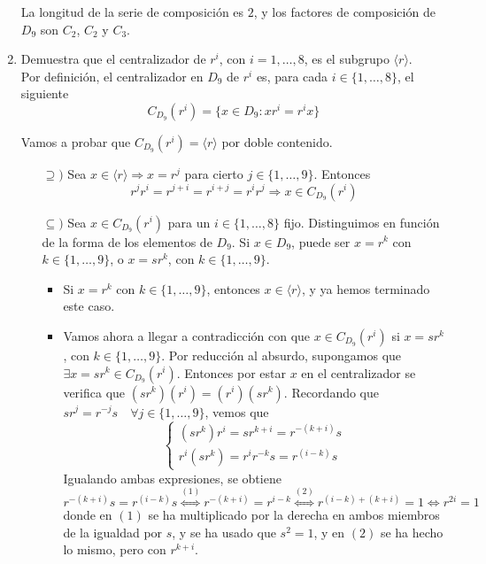 \documentclass[12pt]{article}
\begin{document}
\begin{ejercicio}[3 puntos]
\begin{enumerate}[label=(\alph*)]
            La longitud de la serie de composición es $2$, y los factores de composición de $D_9$ son $C_2$, $C_2$ y $C_3$.

            \item Demuestra que el centralizador de $r^i$, con $i = 1,\dots,8$, es el subgrupo $\langle r \rangle$. \\
            
            Por definición, el centralizador en $D_9$ de $r^i$ es, para cada $i \in \{1, \ldots, 8\}$, el siguiente $$C_{D_9}(r^i) = \{x \in D_9 : xr^i = r^ix\}$$

            Vamos a probar que $C_{D_9}(r^i) = \langle r \rangle$ por doble contenido.

            \begin{itemize}
                \item[$\supseteq)$] Sea $x \in \langle r \rangle \Longrightarrow x = r^j$ para cierto $j \in \{1, \ldots, 9\}$. Entonces $$r^{j}r^{i} = r^{j+i} = r^{i+j} = r^{i}r^{j} \Longrightarrow x \in C_{D_9}(r^i)$$
                \item[$\subseteq)$] Sea $x \in C_{D_9}(r^i)$ para un $i \in \{1, \ldots, 8\}$ fijo. Distinguimos en función de la forma de los elementos de $D_9$. Si $x \in D_9$, puede ser $x = r^k$ con $k \in \{1, \ldots, 9\}$, o $x = sr^k$, con $k \in \{1, \ldots, 9\}$.
                \begin{itemize}
                    \item Si $x = r^k$ con $k \in \{1, \ldots, 9\}$, entonces $x \in \langle r \rangle$, y ya hemos terminado este caso.
                    \item Vamos ahora a llegar a contradicción con que $x \in C_{D_9}(r^i)$ si $x = sr^k$, con $k \in \{1, \ldots, 9\}$. Por reducción al absurdo, supongamos que $\exists x = sr^k \in C_{D_9}(r^i)$. Entonces por estar $x$ en el centralizador se verifica que $(sr^k)(r^i) = (r^i)(sr^k)$.
                    Recordando que $sr^j = r^{-j} s \quad \forall j \in \{1, \ldots, 9\}$, vemos que $$\begin{cases}
                        (sr^k)r^i = sr^{k+i} = r^{-(k+i)}s \\
                        r^i(sr^k) = r^i r^{-k} s = r^{(i-k)}s
                    \end{cases}$$
                    Igualando ambas expresiones, se obtiene $$r^{-(k+i)} s = r^{(i-k)}s \stackrel{(1)}{\iff} r^{-(k+i)} = r^{i-k} \stackrel{(2)}{\iff} r^{(i-k) + (k+i)} = 1 \iff r^{2i} = 1$$
                    donde en $(1)$ se ha multiplicado por la derecha en ambos miembros de la igualdad por $s$, y se ha usado que $s^2 = 1$, y en $(2)$ se ha hecho lo mismo, pero con $r^{k+i}$. \\
                    

\end{itemize}
\end{itemize}
\end{enumerate}
\end{ejercicio}
\end{document}
